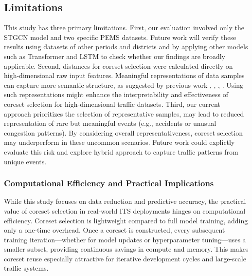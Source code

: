 \subsection{Limitations}
This study has three primary limitations. First, our evaluation involved only the STGCN model and two specific PEMS datasets. Future work will verify these results using datasets of other periods and districts and by applying other models such as Transformer and LSTM to check  whether our findings are broadly applicable.
Second, distances for coreset selection were calculated directly on high-dimensional raw input features.  Meaningful representations of data samples can capture more semantic structure, as suggested by previous work \cite{zheng_coverage-centric_2022}, \cite{xia_moderate_2022}, \cite{maharana_d2_2023}, \cite{tan_data_2025}. Using such representations might enhance the interpretability and effectiveness of coreset selection for high-dimensional traffic datasets.
Third, our current approach prioritizes the selection of representative samples, may lead to reduced representation of rare but meaningful events (e.g., accidents or unusual congestion patterns). By considering overall representativeness, coreset selection may underperform in these uncommon scenarios. Future work could explictly evaluate this risk and explore hybrid approach to capture traffic patterns from unique events.

\subsubsection{Computational Efficiency and Practical Implications}
While this study focuses on data reduction and predictive accuracy, the practical value of coreset selection in real-world ITS deployments hinges on computational efficiency. Coreset selection is lightweight compared to full model training, adding only a one‐time overhead. Once a coreset is constructed, every subsequent training iteration—whether for model updates or hyperparameter tuning—uses a smaller subset, providing continuous savings in compute and memory. This makes coreset reuse especially attractive for iterative development cycles and large‐scale traffic systems.
